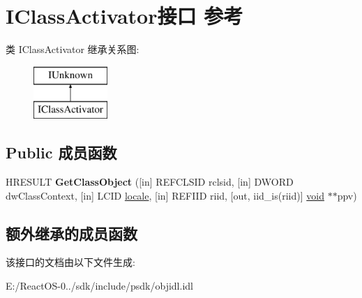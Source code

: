 \hypertarget{interface_i_class_activator}{}\section{I\+Class\+Activator接口 参考}
\label{interface_i_class_activator}
类 I\+Class\+Activator 继承关系图\+:\begin{figure}[H]
\begin{center}
\leavevmode
\includegraphics[height=2.000000cm]{interface_i_class_activator}
\end{center}
\end{figure}
\subsection*{Public 成员函数}
\begin{DoxyCompactItemize}
\item 
\mbox{\label{interface_i_class_activator_a5d81772ef37ef2d07bc5d383ebf01335}} 
H\+R\+E\+S\+U\+LT {\bfseries Get\+Class\+Object} (\mbox{[}in\mbox{]} R\+E\+F\+C\+L\+S\+ID rclsid, \mbox{[}in\mbox{]} D\+W\+O\+RD dw\+Class\+Context, \mbox{[}in\mbox{]} L\+C\+ID \hyperlink{classlocale}{locale}, \mbox{[}in\mbox{]} R\+E\+F\+I\+ID riid, \mbox{[}out, iid\+\_\+is(riid)\mbox{]} \hyperlink{interfacevoid}{void} $\ast$$\ast$ppv)
\end{DoxyCompactItemize}
\subsection*{额外继承的成员函数}


该接口的文档由以下文件生成\+:\begin{DoxyCompactItemize}
\item 
E\+:/\+React\+O\+S-\/0../sdk/include/psdk/objidl.\+idl\end{DoxyCompactItemize}
